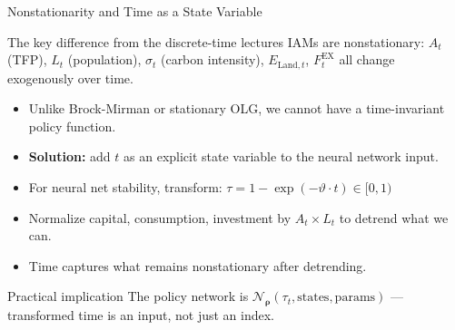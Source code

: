 \documentclass[aspectratio=169,11pt]{beamer}
\newcommand{\emphc}[1]{\textcolor{harvardcrimson}{#1}}
\newcommand{\nn}{\mathcal{N}_{\bm{\rho}}}
\begin{document}
\begin{frame}{Nonstationarity and Time as a State Variable}
\begin{alertblock}{The key difference from the discrete-time lectures}
IAMs are \emphc{nonstationary}: $A_t$ (TFP), $L_t$ (population), $\sigma_t$ (carbon intensity), $E_{\mathrm{Land},t}$, $F^{\mathrm{EX}}_t$ all change exogenously over time.
\end{alertblock}

\vspace{0.2cm}
\begin{itemize}
    \item Unlike Brock-Mirman or stationary OLG, we \emphc{cannot} have a time-invariant policy function.
    \item \textbf{Solution:} add $t$ as an explicit state variable to the neural network input.
    \item For neural net stability, transform: $\tau = 1 - \exp(-\vartheta \cdot t) \in [0,1)$
    \item Normalize capital, consumption, investment by $A_t \times L_t$ to detrend what we can.
    \item Time captures what \emphc{remains nonstationary} after detrending.
\end{itemize}

\vspace{0.2cm}
\begin{exampleblock}{Practical implication}
The policy network is $\nn(\tau_t, \text{states}, \text{params})$ --- transformed time is an \emphc{input}, not just an index.
\end{exampleblock}
\end{frame}
\end{document}
